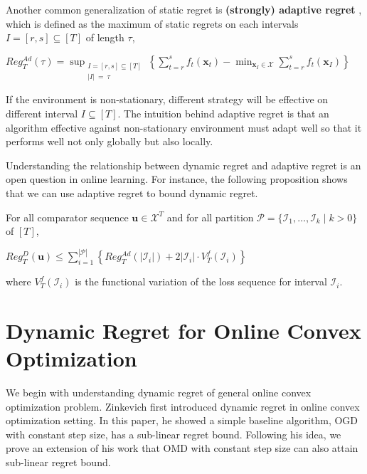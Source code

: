 \documentclass[12pt, a4paper]{report}
\begin{document}
\begin{rem}
Another common generalization of static regret is \textbf{(strongly) adaptive regret} \cite{Hazan2007AdaptiveAF, Hazan2009EfficientLA, Daniely2015StronglyAO}, which is defined as the maximum of static regrets on each intervals $I = [r, s] \subseteq [T]$ of length $\tau$,
\begin{center}
    $\displaystyle Reg_{T}^{Ad}(\tau) = \sup_{\substack{I=[r, s] \subseteq [T] \\ |I|\ =\ \tau}} \left\{\sum_{t=r}^s f_t(\mathbf{x}_t) - \min_{\mathbf{x}_I \in \mathcal{X}} \sum_{t=r}^s f_t(\mathbf{x}_I) \right\}$
\end{center}
If the environment is non-stationary, different strategy will be effective on different interval $I \subseteq [T]$.
The intuition behind adaptive regret is that an algorithm effective against non-stationary environment must adapt well so that it performs well not only globally but also locally.

Understanding the relationship between dynamic regret and adaptive regret is an open question in online learning. For instance, the following proposition shows that we can use adaptive regret to bound dynamic regret.
\begin{prop} \cite[Theorem 3]{Zhang2018DynamicRO}
For all comparator sequence $\mathbf{u} \in \mathcal{X}^T$ and for all partition $\mathcal{P} = \{ \mathcal{I}_1, \dots, \mathcal{I}_k \mid k > 0 \}$ of $[T]$,
\begin{center}
    $\displaystyle Reg_T^D(\mathbf{u}) \leq \sum_{i=1}^{|\mathcal{P}|} \left\{Reg_T^{Ad}\left(|\mathcal{I}_i|\right) + 2|\mathcal{I}_i| \cdot V_T^f(\mathcal{I}_i) \right\}$
\end{center}
where $V_T^f(\mathcal{I}_i)$ is the functional variation of the loss sequence for interval $\mathcal{I}_i$. 
\end{prop}
\end{rem}

\section{Dynamic Regret for Online Convex Optimization}
We begin with understanding dynamic regret of general online convex optimization problem. Zinkevich \cite{Zinkevich2003OnlineCP} first introduced dynamic regret in online convex optimization setting. In this paper, he showed a simple baseline algorithm, OGD with constant step size, has a sub-linear regret bound. Following his idea, we prove an extension of his work that OMD with constant step size can also attain sub-linear regret bound.
\end{document}
